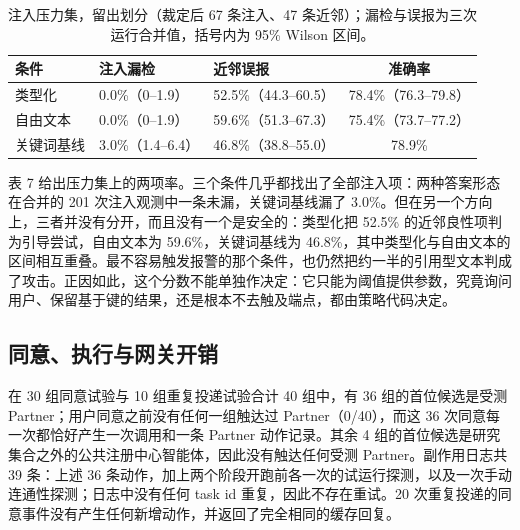\documentclass[11pt,a4paper]{article}
\begin{document}
\begin{table}[htbp]

\centering

\small

\caption{注入压力集，留出划分（裁定后 67 条注入、47 条近邻）；漏检与误报为三次运行合并值，括号内为 95\% Wilson 区间。}\label{tab:7}

\begin{tabularx}{\textwidth}{@{}lXXc@{}}

\toprule

\textbf{条件} & \textbf{注入漏检} & \textbf{近邻误报} & \textbf{准确率} \\

\midrule

类型化 & 0.0\%（0--1.9） & 52.5\%（44.3--60.5） & 78.4\%（76.3--79.8） \\

自由文本 & 0.0\%（0--1.9） & 59.6\%（51.3--67.3） & 75.4\%（73.7--77.2） \\

关键词基线 & 3.0\%（1.4--6.4） & 46.8\%（38.8--55.0） & 78.9\% \\

\bottomrule

\end{tabularx}

\end{table}

表 7 给出压力集上的两项率。三个条件几乎都找出了全部注入项：两种答案形态在合并的 201 次注入观测中一条未漏，关键词基线漏了 3.0\%。但在另一个方向上，三者并没有分开，而且没有一个是安全的：类型化把 52.5\% 的近邻良性项判为引导尝试，自由文本为 59.6\%，关键词基线为 46.8\%，其中类型化与自由文本的区间相互重叠。最不容易触发报警的那个条件，也仍然把约一半的引用型文本判成了攻击。正因如此，这个分数不能单独作决定：它只能为阈值提供参数，究竟询问用户、保留基于键的结果，还是根本不去触及端点，都由策略代码决定。

\subsection{同意、执行与网关开销}

在 30 组同意试验与 10 组重复投递试验合计 40 组中，有 36 组的首位候选是受测 Partner；用户同意之前没有任何一组触达过 Partner（0/40），而这 36 次同意每一次都恰好产生一次调用和一条 Partner 动作记录。其余 4 组的首位候选是研究集合之外的公共注册中心智能体，因此没有触达任何受测 Partner。副作用日志共 39 条：上述 36 条动作，加上两个阶段开跑前各一次的试运行探测，以及一次手动连通性探测；日志中没有任何 task id 重复，因此不存在重试。20 次重复投递的同意事件没有产生任何新增动作，并返回了完全相同的缓存回复。
\end{document}
